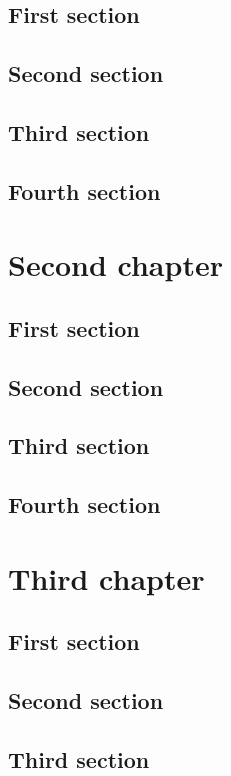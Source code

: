 \documentclass{researchbook}
\begin{document}
\section{First section}\lipsum
\section{Second section}\lipsum
\section{Third section}\lipsum
\section{Fourth section}\lipsum


\chapter{Second chapter}

\section{First section}\lipsum
\section{Second section}\lipsum
\section{Third section}\lipsum
\section{Fourth section}\lipsum


\chapter{Third chapter}

\section{First section}\lipsum
\section{Second section}\lipsum
\section{Third section}\lipsum
\end{document}

